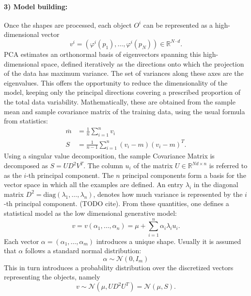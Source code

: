 \documentclass{InsightArticle}
\def\R{\mathds{R}} %
\begin{document}
\paragraph{3) Model building:}
Once the shapes are processed, each object $O^i$ can be
represented as a high-dimensional vector 
\[
v^i = (\varphi^i(p_1), \ldots, \varphi^i(p_N)) \in \R^{N\cdot d}.  
\]
PCA estimates an orthonormal basis of eigenvectors spanning this
high-dimensional space, defined iteratively as the directions onto
which the projection of the data has maximum variance. The set of
variances along these axes are the eigenvalues.  This offers the
opportunity to reduce the dimensionality of the model, keeping only
the principal directions covering a prescribed proportion of the total
data variability.  Mathematically, these are obtained from the sample mean and sample covariance matrix of the 
training data, using the usual formula from statistics:
\begin{equation}
 \begin{split}
   \overline{m} & = \frac{1}{n} \sum_{i=1}^n v_i \\
   S &= \frac{1}{n-1} \sum_{i=1}^n (v_i -m) (v_i - m)^T.
   \end{split}
\end{equation}
Using a singular value decomposition, the sample Covariance Matrix is decomposed
as $S=UD^2V^T$. The column $u_i$ of the 
matrix $U \in \R^{Nd \times n}$ is referred to as the $i$-th principal component.
The $n$ principal components form a basis for the vector space in which all the examples are defined. 
An entry $\lambda_i$ in the diagonal matrix $D^2 = \text{diag}(\lambda_1, \ldots, \lambda_n)$,  denotes how much variance is represented by the $i$-th principal component. (TODO cite).
From these quantities, one defines a statistical model as the low dimensional generative model:
\[
v = v(\alpha_1, \ldots, \alpha_n) = \mu  + \sum_{i=1}^n \alpha_i \lambda_i u_i.
\]
Each vector $\alpha = (\alpha_1, \ldots, \alpha_m)$ introduces a unique shape. 
Usually it is assumed that $\alpha$ follows a standard normal distribution: 
\begin{equation} \label{eq:coeff-normal-assumption}
\alpha  \sim \mathcal{N}(0, I_m)
\end{equation}
This in turn introduces a probability distribution over the discretized vectors representing the objects, namely 
\begin{equation} \label{eq:prob-interpretation}
v \sim \mathcal{N}(\mu, UD^2U^T) = \mathcal{N}(\mu, S).
\end{equation}
\end{document}
